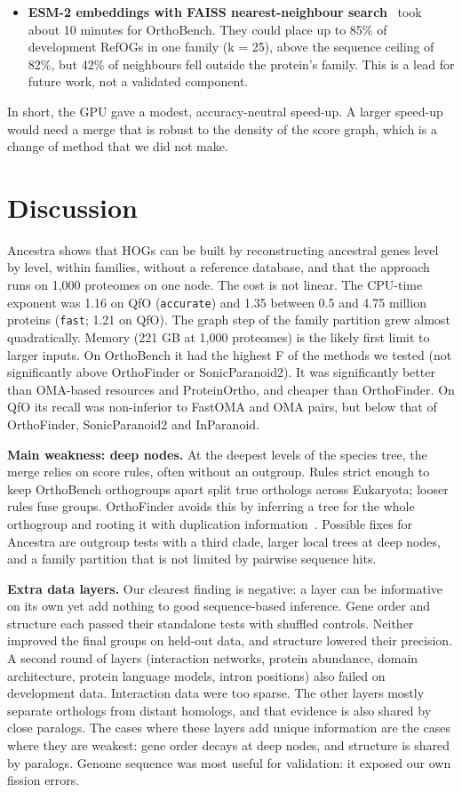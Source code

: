 \begin{itemize}
\item \textbf{ESM-2 embeddings with FAISS nearest-neighbour search}~\cite{lin2023esm2,douze2026faiss} took about 10 minutes for OrthoBench. They could place up to 85\% of development RefOGs in one family (k = 25), above the sequence ceiling of 82\%, but 42\% of neighbours fell outside the protein's family. This is a lead for future work, not a validated component.
\end{itemize}
In short, the GPU gave a modest, accuracy-neutral speed-up. A larger speed-up would need a merge that is robust to the density of the score graph, which is a change of method that we did not make.

\section*{Discussion}
Ancestra shows that HOGs can be built by reconstructing ancestral genes level by level, within families, without a reference database, and that the approach runs on 1,000 proteomes on one node. The cost is not linear. The CPU-time exponent was 1.16 on QfO (\texttt{accurate}) and 1.35 between 0.5 and 4.75 million proteins (\texttt{fast}; 1.21 on QfO). The graph step of the family partition grew almost quadratically. Memory (221 GB at 1,000 proteomes) is the likely first limit to larger inputs. On OrthoBench it had the highest F of the methods we tested (not significantly above OrthoFinder or SonicParanoid2). It was significantly better than OMA-based resources and ProteinOrtho, and cheaper than OrthoFinder. On QfO its recall was non-inferior to FastOMA and OMA pairs, but below that of OrthoFinder, SonicParanoid2 and InParanoid.

\textbf{Main weakness: deep nodes.} At the deepest levels of the species tree, the merge relies on score rules, often without an outgroup. Rules strict enough to keep OrthoBench orthogroups apart split true orthologs across Eukaryota; looser rules fuse groups. OrthoFinder avoids this by inferring a tree for the whole orthogroup and rooting it with duplication information~\cite{emms2017stride,emms2019orthofinder}. Possible fixes for Ancestra are outgroup tests with a third clade, larger local trees at deep nodes, and a family partition that is not limited by pairwise sequence hits.

\textbf{Extra data layers.} Our clearest finding is negative: a layer can be informative on its own yet add nothing to good sequence-based inference. Gene order and structure each passed their standalone tests with shuffled controls. Neither improved the final groups on held-out data, and structure lowered their precision. A second round of layers (interaction networks, protein abundance, domain architecture, protein language models, intron positions) also failed on development data. Interaction data were too sparse. The other layers mostly separate orthologs from distant homologs, and that evidence is also shared by close paralogs. The cases where these layers add unique information are the cases where they are weakest: gene order decays at deep nodes, and structure is shared by paralogs. Genome sequence was most useful for validation: it exposed our own fission errors.

